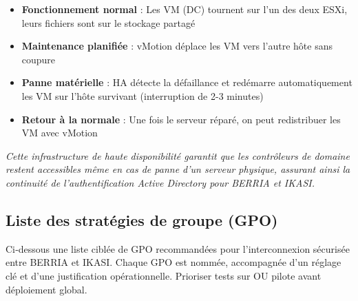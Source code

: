 \begin{itemize}
	\item \textbf{Fonctionnement normal} : Les VM (DC) tournent sur l'un des deux ESXi, leurs fichiers sont sur le stockage partagé
	\item \textbf{Maintenance planifiée} : vMotion déplace les VM vers l'autre hôte sans coupure
	\item \textbf{Panne matérielle} : HA détecte la défaillance et redémarre automatiquement les VM sur l'hôte survivant (interruption de 2-3 minutes)
	\item \textbf{Retour à la normale} : Une fois le serveur réparé, on peut redistribuer les VM avec vMotion
\end{itemize}

\vspace{0.3cm}
\noindent \textit{Cette infrastructure de haute disponibilité garantit que les contrôleurs de domaine restent accessibles même en cas de panne d'un serveur physique, assurant ainsi la continuité de l'authentification Active Directory pour BERRIA et IKASI.}

\newpage

\subsection*{Liste des stratégies de groupe (GPO)}
{}
\noindent Ci‑dessous une liste ciblée de GPO recommandées pour l'interconnexion sécurisée entre BERRIA et IKASI. Chaque GPO est nommée, accompagnée d'un réglage clé et d'une justification opérationnelle. Prioriser tests sur OU pilote avant déploiement global.

